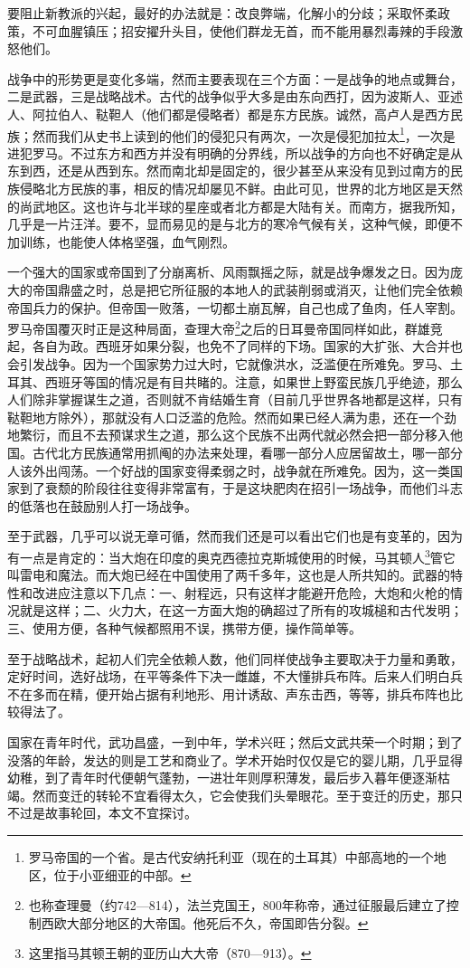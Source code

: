 \par 要阻止新教派的兴起，最好的办法就是：改良弊端，化解小的分歧；采取怀柔政策，不可血腥镇压；招安擢升头目，使他们群龙无首，而不能用暴烈毒辣的手段激怒他们。
\par 战争中的形势更是变化多端，然而主要表现在三个方面：一是战争的地点或舞台，二是武器，三是战略战术。古代的战争似乎大多是由东向西打，因为波斯人、亚述人、阿拉伯人、鞑靼人（他们都是侵略者）都是东方民族。诚然，高卢人是西方民族；然而我们从史书上读到的他们的侵犯只有两次，一次是侵犯加拉太\footnote{罗马帝国的一个省。是古代安纳托利亚（现在的土耳其）中部高地的一个地区，位于小亚细亚的中部。}，一次是进犯罗马。不过东方和西方并没有明确的分界线，所以战争的方向也不好确定是从东到西，还是从西到东。然而南北却是固定的，很少甚至从来没有见到过南方的民族侵略北方民族的事，相反的情况却屡见不鲜。由此可见，世界的北方地区是天然的尚武地区。这也许与北半球的星座或者北方都是大陆有关。而南方，据我所知，几乎是一片汪洋。要不，显而易见的是与北方的寒冷气候有关，这种气候，即便不加训练，也能使人体格坚强，血气刚烈。
\par 一个强大的国家或帝国到了分崩离析、风雨飘摇之际，就是战争爆发之日。因为庞大的帝国鼎盛之时，总是把它所征服的本地人的武装削弱或消灭，让他们完全依赖帝国兵力的保护。但帝国一败落，一切都土崩瓦解，自己也成了鱼肉，任人宰割。罗马帝国覆灭时正是这种局面，查理大帝\footnote{也称查理曼（约742—814），法兰克国王，800年称帝，通过征服最后建立了控制西欧大部分地区的大帝国。他死后不久，帝国即告分裂。}之后的日耳曼帝国同样如此，群雄竞起，各自为政。西班牙如果分裂，也免不了同样的下场。国家的大扩张、大合并也会引发战争。因为一个国家势力过大时，它就像洪水，泛滥便在所难免。罗马、土耳其、西班牙等国的情况是有目共睹的。注意，如果世上野蛮民族几乎绝迹，那么人们除非掌握谋生之道，否则就不肯结婚生育（目前几乎世界各地都是这样，只有鞑靼地方除外），那就没有人口泛滥的危险。然而如果已经人满为患，还在一个劲地繁衍，而且不去预谋求生之道，那么这个民族不出两代就必然会把一部分移入他国。古代北方民族通常用抓阄的办法来处理，看哪一部分人应居留故土，哪一部分人该外出闯荡。一个好战的国家变得柔弱之时，战争就在所难免。因为，这一类国家到了衰颓的阶段往往变得非常富有，于是这块肥肉在招引一场战争，而他们斗志的低落也在鼓励别人打一场战争。
\par 至于武器，几乎可以说无章可循，然而我们还是可以看出它们也是有变革的，因为有一点是肯定的：当大炮在印度的奥克西德拉克斯城使用的时候，马其顿人\footnote{这里指马其顿王朝的亚历山大大帝（870—913）。}管它叫雷电和魔法。而大炮已经在中国使用了两千多年，这也是人所共知的。武器的特性和改进应注意以下几点：一、射程远，只有这样才能避开危险，大炮和火枪的情况就是这样；二、火力大，在这一方面大炮的确超过了所有的攻城槌和古代发明；三、使用方便，各种气候都照用不误，携带方便，操作简单等。
\par 至于战略战术，起初人们完全依赖人数，他们同样使战争主要取决于力量和勇敢，定好时间，选好战场，在平等条件下决一雌雄，不大懂排兵布阵。后来人们明白兵不在多而在精，便开始占据有利地形、用计诱敌、声东击西，等等，排兵布阵也比较得法了。
\par 国家在青年时代，武功昌盛，一到中年，学术兴旺；然后文武共荣一个时期；到了没落的年龄，发达的则是工艺和商业了。学术开始时仅仅是它的婴儿期，几乎显得幼稚，到了青年时代便朝气蓬勃，一进壮年则厚积薄发，最后步入暮年便逐渐枯竭。然而变迁的转轮不宜看得太久，它会使我们头晕眼花。至于变迁的历史，那只不过是故事轮回，本文不宜探讨。






